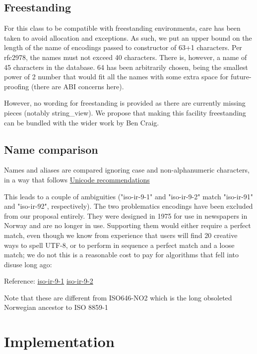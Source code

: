 \documentclass{wg21}
\begin{document}
\subsection{Freestanding}

For this class to be compatible with freestanding environments, care has been taken to avoid
allocation and exceptions.
As such, we put an upper bound on the length of the name of encodings passed to  constructor of 63+1 characters.
Per rfc2978, the names must not exceed 40 characters.
There is, however, a name of 45 characters in the database.
64 has been arbitrarily chosen, being the smallest power of 2 number that would fit all the names with some extra space for future-proofing (there are ABI concerns here).

However, no wording for freestanding is provided as there are currently missing pieces (notably string_view).
We propose that making this facility freestanding can be bundled with the wider work by Ben Craig.

\subsection{Name comparison}

Names and aliases are compared ignoring case and non-alphanumeric characters, in a way that follows
\href{https://www.unicode.org/reports/tr22/tr22-8.html#Charset_Alias_Matching}{Unicode recommendations}

This leads to a couple of ambiguities ("iso-ir-9-1" and "iso-ir-9-2" match "iso-ir-91" and "iso-ir-92", respectively).
The two problematics encodings have been excluded from our proposal entirely.
They were designed in 1975 for use in newspapers in Norway and are no longer in use. Supporting them would either require a perfect match, even though we know from experience that users will find 20 creative ways to spell UTF-8, or to perform in sequence a perfect match and a loose match; we do not this is a reasonable cost to pay for algorithms that fell into disuse long ago:


Reference: \href{https://www.itscj.ipsj.or.jp/iso-ir/009-1.pdf}{iso-ir-9-1} \href{https://www.itscj.ipsj.or.jp/iso-ir/009-2.pdf}{iso-ir-9-2}

Note that these are different from ISO646-NO2 which is the long obsoleted Norwegian ancestor to ISO 8859-1


\section{Implementation}
\end{document}
